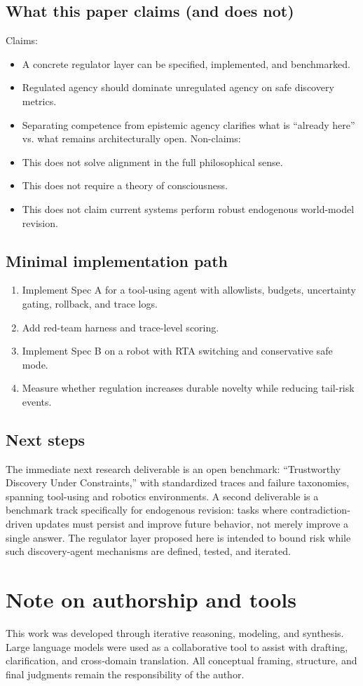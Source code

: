 \documentclass[11pt]{article}
\begin{document}
\subsection{What this paper claims (and does not)}
Claims:
\begin{itemize}
\item 
A concrete regulator layer can be specified, implemented, and benchmarked.
\item 
Regulated agency should dominate unregulated agency on safe discovery metrics.
\item 
Separating competence from epistemic agency clarifies what is “already here” vs. what remains
architecturally open.
Non-claims:
\item 
This does not solve alignment in the full philosophical sense.
\item 
This does not require a theory of consciousness.
\item 
This does not claim current systems perform robust endogenous world-model revision.
\end{itemize}
\subsection{Minimal implementation path}
\begin{enumerate}
\item Implement Spec A for a tool-using agent with allowlists, budgets, uncertainty gating, rollback,
and trace logs.
\item Add red-team harness and trace-level scoring.
\item Implement Spec B on a robot with RTA switching and conservative safe mode.
\item Measure whether regulation increases durable novelty while reducing tail-risk events.
\end{enumerate}
\subsection{Next steps}
The immediate next research deliverable is an open benchmark: “Trustworthy Discovery Under
Constraints,” with standardized traces and failure taxonomies, spanning tool-using and robotics
environments.
A second deliverable is a benchmark track specifically for endogenous revision: tasks where
contradiction-driven updates must persist and improve future behavior, not merely improve a single
answer. The regulator layer proposed here is intended to bound risk while such discovery-agent
mechanisms are defined, tested, and iterated.


\section*{Note on authorship and tools}
This work was developed through iterative reasoning, modeling, and synthesis. Large language models were used as a
collaborative tool to assist with drafting, clarification, and cross-domain translation. All conceptual framing,
structure, and final judgments remain the responsibility of the author.
\end{document}
